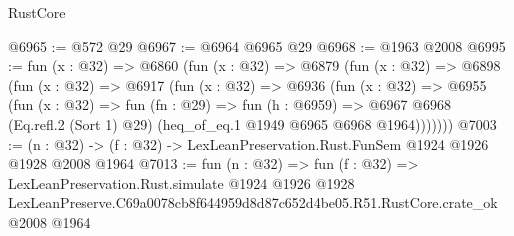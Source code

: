\begin{lexlean}{RustCore}
\begin{coremodule}
@6965 := @572 @29
@6967 := @6964 @6965 @29
@6968 := @1963 @2008
@6995 := fun (x : @32) =>
  @6860
    (fun (x : @32) =>
    @6879
      (fun (x : @32) =>
      @6898
        (fun (x : @32) =>
        @6917
          (fun (x : @32) =>
          @6936
            (fun (x : @32) =>
            @6955
              (fun (x : @32) =>
              fun (fn : @29) =>
              fun (h : @6959) =>
              @6967 @6968 (Eq.refl.{2} (Sort 1) @29) (heq_of_eq.{1} @1949 @6965 @6968 @1964)))))))
@7003 := (n : @32) -> (f : @32) -> LexLeanPreservation.Rust.FunSem @1924 @1926 @1928 @2008 @1964
@7013 := fun (n : @32) =>
  fun (f : @32) =>
  LexLeanPreservation.Rust.simulate
    @1924
    @1926
    @1928
    LexLeanPreserve.C69a0078cb8f644959d8d87c652d4be05.R51.RustCore.crate_ok
    @2008
    @1964
\end{coremodule}
\end{lexlean}
